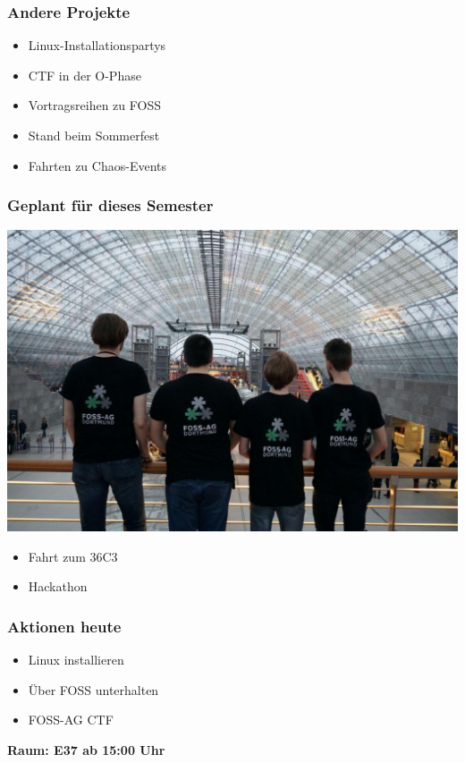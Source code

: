\documentclass[12pt,utf8]{beamer}
\begin{document}
	\begin{frame}
		\frametitle{Andere Projekte}
		\begin{itemize}
			\item Linux-Installationspartys
			\item CTF in der O-Phase
			\item Vortragsreihen zu FOSS
			\item Stand beim Sommerfest
			\item Fahrten zu Chaos-Events
		\end{itemize}
	\end{frame}
	\begin{frame}
		\frametitle{Geplant für dieses Semester}

			
			\centering\includegraphics[width=0.9\linewidth]{resources/35C3.jpeg}
		\begin{itemize}
			\item Fahrt zum 36C3
			\item Hackathon
		\end{itemize}
	\end{frame}

	\begin{frame}
		\frametitle{Aktionen heute}
		\begin{itemize}
			\item Linux installieren
			\item Über FOSS unterhalten
			\item FOSS-AG CTF	
		\end{itemize}
	\textbf{Raum: E37 ab 15:00 Uhr}
	\end{frame}
	
\end{document}

